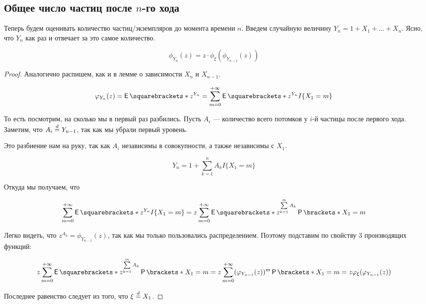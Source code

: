 \subsection{Общее число частиц после $n$-го хода}

Теперь будем оценивать количество частиц/экземпляров до момента времени $n$.
Введем случайную величину $Y_n = 1 + X_1 + \ldots + X_n$. Ясно, что $Y_n$
как раз и отвечает за это самое количество.

\begin{lemma}[О зависимости $Y_n$ и $Y_{n - 1}$]
  \[
    \phi_{Y_n}(z) = z\cdot\phi_{\xi}(\phi_{Y_{n - 1}}(z))
  \]
\end{lemma}

\begin{proof}
  Аналогично распишем, как и в лемме о зависимости $X_n$ и $X_{n - 1}$.

  \[
    \phi_{Y_n}(z) = \E{z^{Y_n}} = \sum\limits_{m = 0}^{+\infty} \E{z^{Y_n}
    I\{X_1 = m\}}
  \]

  То есть посмотрим, на сколько мы в первый раз разбились. Пусть $A_i$ --- 
  количество всего потомков у $i$-й частицы после первого
  хода. Заметим, что $A_i \overset{d}{=} Y_{n - 1}$, так как мы убрали первый уровень.

  Это разбиение нам на руку, так как $A_i$ независимы в совокупности, а также
  независимы с $X_1$.

  \[
    Y_n = 1 + \sum\limits_{k = 1}^n A_kI\{X_1 = m\}
  \]

  Откуда мы получаем, что

  \[
    \sum\limits_{m = 0}^{+\infty} \E{z^{Y_n}
    I\{X_1 = m\}} = z\sum\limits_{m = 0}^{+\infty} \E{z^{\sum\limits_{k = 1}^m
    A_k}} \Pr{X_1 = m}
  \]

  Легко видеть, что $z^{A_k} = \phi_{Y_{n - 1}}(z)$, так как мы только пользовались
  распределением. Поэтому подставим по свойству 3 производящих функций:

  \[
    z\sum\limits_{m = 0}^{+\infty} \E{z^{\sum\limits_{k = 1}^m
    A_k}} \Pr{X_1 = m} = z\sum\limits_{m = 0}^{+\infty} 
    (\phi_{Y_{n - 1}}(z))^m\Pr{X_1 = m} = z\phi_{\xi}(\phi_{Y_{n - 1}}(z))
  \]

  Последнее равенство следует из того, что $\xi \overset{d}{=} X_1$.
\end{proof}

